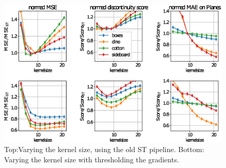 \documentclass  [
  paper    = a4,
  BCOR     = 10mm,
  twoside,
  fontsize = 12pt,
  fleqn,
  toc      = bibnumbered,
  toc      = listofnumbered,
  numbers  = noendperiod,
  headings = normal,
  listof   = leveldown,
  version  = 3.03
]                                       {scrreprt}
\begin{document}
\begin{figure}
	\centering
	\includegraphics[width=1\linewidth]{images/old_outer}
	\caption[Varying kernel size]{Top:Varying the kernel size, using the old ST pipeline. Bottom: Varying the kernel size with thresholding the gradients.}
	\label{fig:oldouter}
\end{figure}
\end{document}
